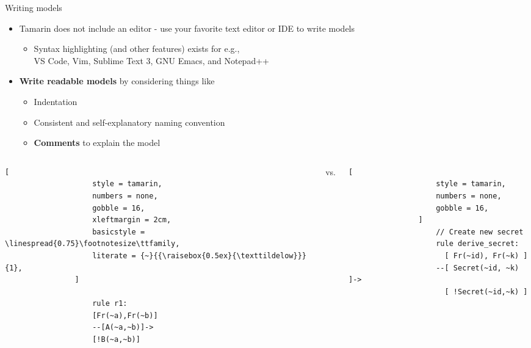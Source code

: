 \documentclass[11pt,aspectratio=169]{beamer}
\begin{document}
\begin{frame}[fragile]{Writing models}
    \begin{itemize}
        \item Tamarin does not include an editor - use your favorite text 
              editor or IDE to write models
        \begin{itemize}
            \item Syntax highlighting (and other features) exists for e.g.,\\
                  VS Code, Vim, Sublime Text 3, GNU Emacs, and Notepad++
        \end{itemize}
        \item \textbf{Write readable models} by considering things like
        \begin{itemize}
            \item Indentation
            \item Consistent and self-explanatory naming convention
            \item \textbf{Comments} to explain the model
        \end{itemize}
    \end{itemize}
    \begin{onlyenv}
        \begin{columns}
            \begin{column}{0.49\textwidth}
                \begin{lstlisting}[
                    style = tamarin,
                    numbers = none,
                    gobble = 16,
                    xleftmargin = 2cm,
                    basicstyle = \linespread{0.75}\footnotesize\ttfamily,
                    literate = {~}{{\raisebox{0.5ex}{\texttildelow}}}{1},
                ]

                    rule r1:
                    [Fr(~a),Fr(~b)]
                    --[A(~a,~b)]->
                    [!B(~a,~b)]
                \end{lstlisting}
            \end{column}
            vs.
            \hspace*{1cm}
            \begin{column}{0.49\textwidth}
                \begin{lstlisting}[
                    style = tamarin,
                    numbers = none,
                    gobble = 16,
                ]
                    // Create new secret
                    rule derive_secret:
                      [ Fr(~id), Fr(~k) ]
                    --[ Secret(~id, ~k) ]->
                      [ !Secret(~id,~k) ]
                \end{lstlisting}
            \end{column}
        \end{columns}
    \end{onlyenv}
\end{frame}
\end{document}
